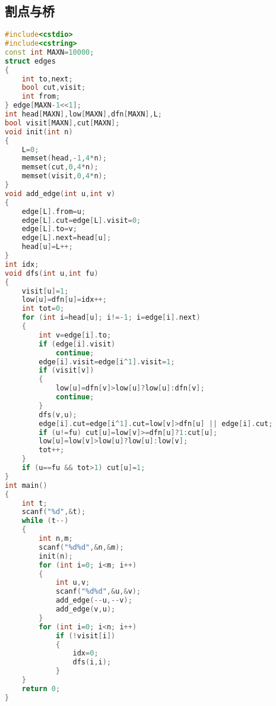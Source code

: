 \subsection{割点与桥}
	\begin{lstlisting}[language=c++]
#include<cstdio>
#include<cstring>
const int MAXN=10000;
struct edges
{
	int to,next;
	bool cut,visit;
	int from;
} edge[MAXN-1<<1];
int head[MAXN],low[MAXN],dfn[MAXN],L;
bool visit[MAXN],cut[MAXN];
void init(int n)
{
	L=0;
	memset(head,-1,4*n);
	memset(cut,0,4*n);
	memset(visit,0,4*n);
}
void add_edge(int u,int v)
{
	edge[L].from=u;
	edge[L].cut=edge[L].visit=0;
	edge[L].to=v;
	edge[L].next=head[u];
	head[u]=L++;
}
int idx;
void dfs(int u,int fu)
{
	visit[u]=1;
	low[u]=dfn[u]=idx++;
	int tot=0;
	for (int i=head[u]; i!=-1; i=edge[i].next)
	{
		int v=edge[i].to;
		if (edge[i].visit)
			continue;
		edge[i].visit=edge[i^1].visit=1;
		if (visit[v])
		{
			low[u]=dfn[v]>low[u]?low[u]:dfn[v];
			continue;
		}
		dfs(v,u);
		edge[i].cut=edge[i^1].cut=low[v]>dfn[u] || edge[i].cut;
		if (u!=fu) cut[u]=low[v]>=dfn[u]?1:cut[u];
		low[u]=low[v]>low[u]?low[u]:low[v];
		tot++;
	}
	if (u==fu && tot>1) cut[u]=1;
}
int main()
{
	int t;
	scanf("%d",&t);
	while (t--)
	{
		int n,m;
		scanf("%d%d",&n,&m);
		init(n);
		for (int i=0; i<m; i++)
		{
			int u,v;
			scanf("%d%d",&u,&v);
			add_edge(--u,--v);
			add_edge(v,u);
		}
		for (int i=0; i<n; i++)
			if (!visit[i])
			{
				idx=0;
				dfs(i,i);
			}
	}
	return 0;
}
	\end{lstlisting}